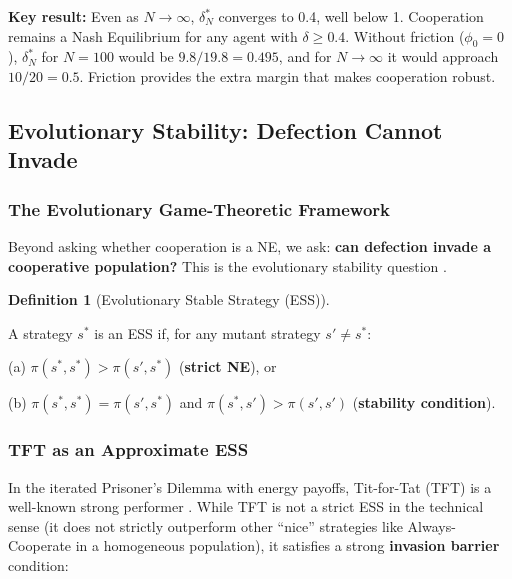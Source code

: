 \documentclass[11pt]{article}
\theoremstyle{plain}
\theoremstyle{definition}
\newtheorem{definition}{Definition}
\theoremstyle{remark}
\let\origsubsection\subsection
\renewcommand{\subsection}{\needspace{7\baselineskip}\origsubsection}
\let\origsubsubsection\subsubsection
\renewcommand{\subsubsection}{\needspace{4\baselineskip}\origsubsubsection}
\begin{document}
\textbf{Key result:} Even as \(N \to \infty\), \(\delta_N^*\) converges
to 0.4, well below 1. Cooperation remains a Nash Equilibrium for any
agent with \(\delta \geq 0.4\). Without friction (\(\phi_0 = 0\)),
\(\delta_N^*\) for \(N = 100\) would be \(9.8/19.8 = 0.495\), and for
\(N \to \infty\) it would approach \(10/20 = 0.5\). Friction provides
the extra margin that makes cooperation robust.

\subsection{Evolutionary Stability: Defection Cannot
Invade}\label{evolutionary-stability-defection-cannot-invade}

\subsubsection{The Evolutionary Game-Theoretic
Framework}\label{the-evolutionary-game-theoretic-framework}

Beyond asking whether cooperation is a NE, we ask: \textbf{can defection
invade a cooperative population?} This is the evolutionary stability
question \citep{MaynardSmith1973}.

\begin{definition}[Evolutionary Stable Strategy (ESS)]
\label{def-ess}

A strategy $s^*$ is an ESS if, for any mutant strategy $s' \neq s^*$:

(a) $\pi(s^*, s^*) > \pi(s', s^*)$ (\textbf{strict NE}), or

(b) $\pi(s^*, s^*) = \pi(s', s^*)$ and $\pi(s^*, s') > \pi(s', s')$ (\textbf{stability condition}).
\end{definition}

\subsubsection{TFT as an Approximate
ESS}\label{tft-as-an-approximate-ess}

In the iterated Prisoner's Dilemma with energy payoffs, Tit-for-Tat
(TFT) is a well-known strong performer \citep{Axelrod1984}. While TFT is
not a strict ESS in the technical sense (it does not strictly outperform
other ``nice'' strategies like Always-Cooperate in a homogeneous
population), it satisfies a strong \textbf{invasion barrier} condition:
\end{document}
